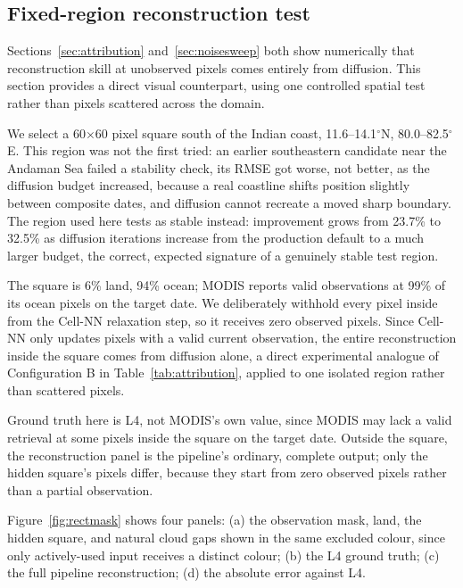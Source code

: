 \documentclass[final,5p,times,twocolumn,authoryear]{elsarticle}
\begin{document}
\subsection{Fixed-region reconstruction test}
\label{sec:rectmask}

Sections~\ref{sec:attribution} and~\ref{sec:noisesweep} both show
numerically that reconstruction skill at unobserved pixels comes
entirely from diffusion. This section provides a direct visual
counterpart, using one controlled spatial test rather than pixels
scattered across the domain.

We select a 60$\times$60 pixel square south of the Indian coast,
11.6--14.1$^{\circ}$N, 80.0--82.5$^{\circ}$E. This region was not the
first tried: an earlier southeastern candidate near the Andaman Sea
failed a stability check, its RMSE got worse, not better, as the
diffusion budget increased, because a real coastline shifts position
slightly between composite dates, and diffusion cannot recreate a
moved sharp boundary. The region used here tests as stable instead:
improvement grows from 23.7\% to 32.5\% as diffusion iterations
increase from the production default to a much larger budget, the
correct, expected signature of a genuinely stable test region.

The square is 6\% land, 94\% ocean; MODIS reports valid observations
at 99\% of its ocean pixels on the target date. We deliberately
withhold every pixel inside from the Cell-NN relaxation step, so it
receives zero observed pixels. Since Cell-NN only updates pixels with
a valid current observation, the entire reconstruction inside the
square comes from diffusion alone, a direct experimental analogue of
Configuration B in Table~\ref{tab:attribution}, applied to one
isolated region rather than scattered pixels.

Ground truth here is L4, not MODIS's own value, since MODIS may lack
a valid retrieval at some pixels inside the square on the target
date. Outside the square, the reconstruction panel is the pipeline's
ordinary, complete output; only the hidden square's pixels differ,
because they start from zero observed pixels rather than a partial
observation.

Figure~\ref{fig:rectmask} shows four panels: (a) the observation
mask, land, the hidden square, and natural cloud gaps shown in the
same excluded colour, since only actively-used input receives a
distinct colour; (b) the L4 ground truth; (c) the full pipeline
reconstruction; (d) the absolute error against L4.
\end{document}
